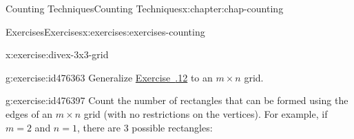 \documentclass[oneside,10pt,]{book}
\newcommand{\xreffont}{\relax}
\numberwithin{equation}{section}
\begin{document}
\begin{chapterptx}{Counting Techniques}{}{Counting Techniques}{}{}{x:chapter:chap-counting}
\begin{exercises-section}{Exercises}{}{Exercises}{}{}{x:exercises:exercises-counting}
\begin{divisionexercise}{12}{}{}{x:exercise:divex-3x3-grid}
\begin{sidebyside}{3}{0.0916666666666667}{0.0916666666666667}{0.183333333333333}
\begin{sbspanel}{0.15}
{
}%
\end{sbspanel}%
\begin{sbspanel}{0.15}%
%
\end{sbspanel}%
\begin{sbspanel}{0.15}%
%
\end{sbspanel}%
\end{sidebyside}%
\end{divisionexercise}%
\begin{divisionexercise}{13}{}{}{g:exercise:id476363}%
Generalize \hyperlink{x:exercise:divex-3x3-grid}{Exercise~{\xreffont 2.7.12}} to an \(m \times n\) grid.%
\end{divisionexercise}%
\begin{divisionexercise}{14}{}{}{g:exercise:id476397}%
Count the number of rectangles that can be formed using the edges of an \(m \times n\) grid (with no restrictions on the vertices). For example, if \(m = 2\) and \(n = 1\), there are 3 possible rectangles:%
\begin{sidebyside}{3}{0.0916666666666667}{0.0916666666666667}{0.183333333333333}%
\begin{sbspanel}{0.15}%
%
\end{sbspanel}%
\begin{sbspanel}{0.15}%
\end{sbspanel}
\end{sidebyside}
\end{divisionexercise}
\end{exercises-section}
\end{chapterptx}
\end{document}
